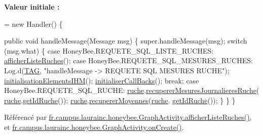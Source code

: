 {\bfseries Valeur initiale \+:}
\begin{DoxyCode}
= \textcolor{keyword}{new} Handler()
    \{
        
        \textcolor{keyword}{public} \textcolor{keywordtype}{void} handleMessage(Message msg)
        \{
            super.handleMessage(msg);
            \textcolor{keywordflow}{switch} (msg.what)
            \{
                \textcolor{keywordflow}{case} HoneyBee.REQUETE\_SQL\_LISTE\_RUCHES:
                    \hyperlink{classfr_1_1campus_1_1laurainc_1_1honeybee_1_1_graph_activity_a9e7c089cbecac26d4251fa5310038107}{afficherListeRuches}();
                \textcolor{keywordflow}{case} HoneyBee.REQUETE\_SQL\_MESURES\_RUCHES:
                    Log.d(\hyperlink{classfr_1_1campus_1_1laurainc_1_1honeybee_1_1_graph_activity_a23295afaba61fcec14a254a6359deea4}{TAG}, \textcolor{stringliteral}{"handleMessage -> REQUETE SQL MESURES RUCHE"});
                    \hyperlink{classfr_1_1campus_1_1laurainc_1_1honeybee_1_1_graph_activity_a7000895983725c6f795f7c73c1fafd20}{initialisationElementsIHM}();
                    \hyperlink{classfr_1_1campus_1_1laurainc_1_1honeybee_1_1_graph_activity_a8dc56c3e0744bcb9295ad10e726b5fdb}{initialiserCallBacks}();
                    \textcolor{keywordflow}{break};
                \textcolor{keywordflow}{case} HoneyBee.REQUETE\_SQL\_RUCHE:
                    \hyperlink{classfr_1_1campus_1_1laurainc_1_1honeybee_1_1_graph_activity_ae4312ed40c4a4bf731eb0834155165de}{ruche}.\hyperlink{classfr_1_1campus_1_1laurainc_1_1honeybee_1_1_ruche_a84de3c3af21b1cbeae2075e480acaabc}{recupererMesuresJournalieresRuche}(
      \hyperlink{classfr_1_1campus_1_1laurainc_1_1honeybee_1_1_graph_activity_ae4312ed40c4a4bf731eb0834155165de}{ruche}.\hyperlink{classfr_1_1campus_1_1laurainc_1_1honeybee_1_1_ruche_ace3993bb5f36dc8c63f18bcc3ac75adf}{getIdRuche}());
                    \hyperlink{classfr_1_1campus_1_1laurainc_1_1honeybee_1_1_graph_activity_ae4312ed40c4a4bf731eb0834155165de}{ruche}.\hyperlink{classfr_1_1campus_1_1laurainc_1_1honeybee_1_1_ruche_a94f815b44f0d5d8682833d6b6e783713}{recupererMoyennes}(\hyperlink{classfr_1_1campus_1_1laurainc_1_1honeybee_1_1_graph_activity_ae4312ed40c4a4bf731eb0834155165de}{ruche}.
      \hyperlink{classfr_1_1campus_1_1laurainc_1_1honeybee_1_1_ruche_ace3993bb5f36dc8c63f18bcc3ac75adf}{getIdRuche}());
            \}
        \}
    \}
\end{DoxyCode}


Référencé par \hyperlink{classfr_1_1campus_1_1laurainc_1_1honeybee_1_1_graph_activity_a9e7c089cbecac26d4251fa5310038107}{fr.\+campus.\+laurainc.\+honeybee.\+Graph\+Activity.\+afficher\+Liste\+Ruches()}, et \hyperlink{classfr_1_1campus_1_1laurainc_1_1honeybee_1_1_graph_activity_a0a59a4caee62f5c1ce090274c1df66b8}{fr.\+campus.\+laurainc.\+honeybee.\+Graph\+Activity.\+on\+Create()}.

